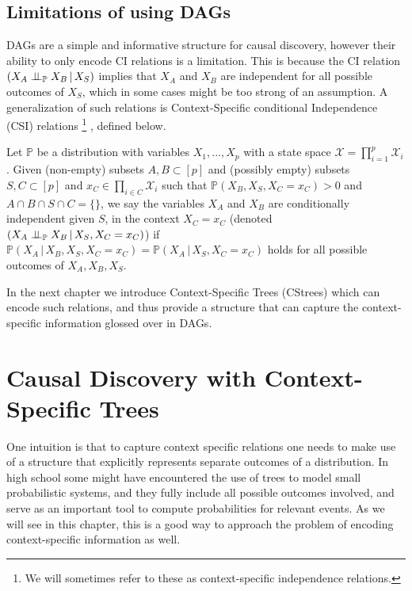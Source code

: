 \documentclass{tufte-book}
\begin{document}
\section{Limitations of using DAGs}
\label{sec:org6e00328}
DAGs are a simple and informative structure for causal discovery, however their ability to only encode CI relations is a limitation. This is because the CI relation  \((X_A \perp \!\!\! \perp_{\mathbb{P}} X_B \,|\, X_S)\) implies that \(X_A\) and \(X_B\) are independent for all possible outcomes of \(X_S\), which in some cases might be too strong of an assumption. A generalization of such relations is Context-Specific conditional Independence (CSI) relations  \footnote{We will sometimes refer to these as context-specific independence relations.} , defined below.
\begin{definition}\label{def:csirel}
Let  $\mathbb{P}$ be a distribution with variables $X_1,...,X_p$ with a state space $\mathcal{X} = \prod_{i=1}^p \mathcal{X}_i$. Given (non-empty) subsets $A,B \subset [p]$ and (possibly empty) subsets $S,C \subset [p]$ and $x_C \in \prod_{i \in C}\mathcal{X}_i $ such that $\mathbb{P}(X_B, X_S, X_C = x_C)>0$ and $A \cap B \cap S \cap C = \{\}$, we say the variables $X_A$ and $X_B$ are conditionally independent given $S$, in the context $X_C=x_C$ (denoted $(X_A\perp \!\!\! \perp_{\mathbb{P}} X_B \,|\, X_S, X_C=x_C)$) if $\mathbb{P}(X_A \,|\,X_B, X_S,X_C=x_C) = \mathbb{P}(X_A \, |\, X_S,X_C=x_C)$ holds for all possible outcomes of $X_A,X_B,X_S$.
\end{definition}


In the next chapter we introduce Context-Specific Trees (CStrees) which can encode such relations, and thus provide a structure that can capture the context-specific information glossed over in DAGs.


 \newpage 

\chapter{Causal Discovery with Context-Specific Trees}
\label{sec:orgf728cd3}
One intuition is that to capture context specific relations one needs to make use of a structure that explicitly represents separate outcomes of a distribution. In high school some might have encountered the use of trees to model small probabilistic systems, and they fully include all possible outcomes involved, and serve as an important tool to compute probabilities for relevant events. As we will see in this chapter, this is a good way to approach the problem of encoding context-specific information as well.
\end{document}
